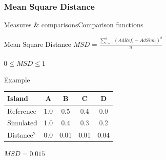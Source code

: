 \documentclass[10pt, aspectratio=43]{beamer}
\begin{document}
\subsubsection{Mean Square Distance}
\begin{frame}{Measures \& comparisons}{Comparison functions}
\begin{mblock}{0.7}{Mean Square Distance}
  \centering  
  $\mathit{MSD} = \frac{\sum\limits_{i=1}^{n} \left( AdRef_i - AdSim_i \right) ^ 2}{n}$\\~\\
  $0 \le \mathit{MSD} \le 1$
\end{mblock}
\pause
\begin{mblock}{0.7}{Example}
  \begin{center}
    \begin{tabu}{@{}lcccc@{}}
      \toprule[1pt]
      Island & A & B & C & D \\
      \midrule
      Reference & 1.0 & 0.5 & 0.4 & 0.0 \\
      Simulated & 1.0 & 0.4 & 0.3 & 0.2 \\
      Distance$^2$ & 0.0 & 0.01 & 0.01 & 0.04 \\
      \bottomrule[1pt]
    \end{tabu}
  \end{center}
  \centering
  $\mathit{MSD} = 0.015$
\end{mblock}
\end{frame}
\end{document}
